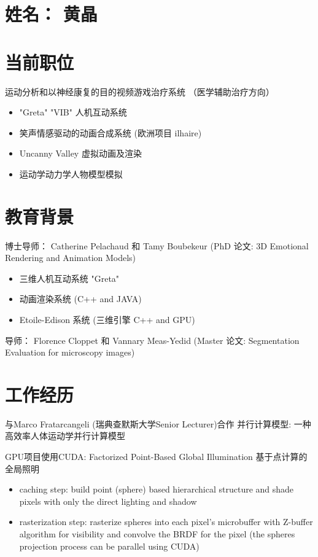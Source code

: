\section{姓名： 黄晶}
\section{当前职位}
{
运动分析和以神经康复的目的视频游戏治疗系统 （医学辅助治疗方向）
}

{
\begin{itemize}
	\item "Greta" "VIB" 人机互动系统
	\item 笑声情感驱动的动画合成系统 (欧洲项目 ilhaire)
	\item Uncanny Valley 虚拟动画及渲染
	\item 运动学动力学人物模型模拟
\end{itemize}
}


\section{教育背景}
{博士导师： Catherine Pelachaud 和 Tamy Boubekeur (PhD 论文: 3D Emotional Rendering and Animation Models)
\begin{itemize}
	\item 三维人机互动系统 "Greta"
	\item 动画渲染系统 (C++ and JAVA)
	\item Etoile-Edison 系统 (三维引擎 C++ and GPU)
\end{itemize}
}  %

{导师： Florence Cloppet 和 Vannary Meas-Yedid (Master 论文: Segmentation Evaluation for microscopy images)
}


\section{工作经历}
{
与Marco Fratarcangeli (瑞典查默斯大学Senior Lecturer)合作
并行计算模型: 一种高效率人体运动学并行计算模型
}
{
GPU项目使用CUDA: Factorized Point-Based Global Illumination  基于点计算的全局照明
\begin{itemize}
	\item caching step: build point (sphere) based hierarchical structure and shade pixels with only the direct lighting and shadow
	\item rasterization step: rasterize spheres into each pixel's microbuffer with Z-buffer algorithm for visibility and convolve the BRDF for the pixel (the spheres projection process can be parallel using CUDA)
\end{itemize}
}

